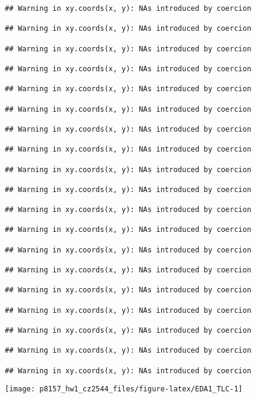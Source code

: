 \documentclass[]{article}
\begin{document}
\begin{verbatim}
## Warning in xy.coords(x, y): NAs introduced by coercion

## Warning in xy.coords(x, y): NAs introduced by coercion

## Warning in xy.coords(x, y): NAs introduced by coercion

## Warning in xy.coords(x, y): NAs introduced by coercion

## Warning in xy.coords(x, y): NAs introduced by coercion

## Warning in xy.coords(x, y): NAs introduced by coercion

## Warning in xy.coords(x, y): NAs introduced by coercion

## Warning in xy.coords(x, y): NAs introduced by coercion

## Warning in xy.coords(x, y): NAs introduced by coercion

## Warning in xy.coords(x, y): NAs introduced by coercion

## Warning in xy.coords(x, y): NAs introduced by coercion

## Warning in xy.coords(x, y): NAs introduced by coercion

## Warning in xy.coords(x, y): NAs introduced by coercion

## Warning in xy.coords(x, y): NAs introduced by coercion

## Warning in xy.coords(x, y): NAs introduced by coercion

## Warning in xy.coords(x, y): NAs introduced by coercion

## Warning in xy.coords(x, y): NAs introduced by coercion

## Warning in xy.coords(x, y): NAs introduced by coercion

## Warning in xy.coords(x, y): NAs introduced by coercion
\end{verbatim}

\texttt{[image: p8157\_hw1\_cz2544\_files/figure-latex/EDA1\_TLC-1]}
\end{document}
